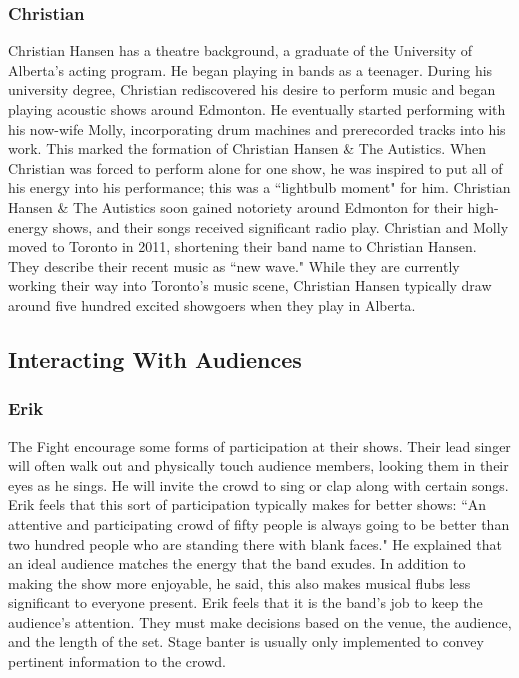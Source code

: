 \subsubsection{Christian}
Christian Hansen has a theatre background, a graduate of the University of Alberta's acting program. He began playing in bands as a teenager. During his university degree, Christian rediscovered his desire to perform music and began playing acoustic shows around Edmonton. He eventually started performing with his now-wife Molly, incorporating drum machines and prerecorded tracks into his work. This marked the formation of Christian Hansen \& The Autistics. When Christian was forced to perform alone for one show, he was inspired to put all of his energy into his performance; this was a ``lightbulb moment" for him. Christian Hansen \& The Autistics soon gained notoriety around Edmonton for their high-energy shows, and their songs received significant radio play. Christian and Molly moved to Toronto in 2011, shortening their band name to Christian Hansen. They describe their recent music as ``new wave." While they are currently working their way into Toronto's music scene, Christian Hansen typically draw around five hundred excited showgoers when they play in Alberta.

\subsection{Interacting With Audiences}

\subsubsection{Erik}
The Fight encourage some forms of participation at their shows. Their lead singer will often walk out and physically touch audience members, looking them in their eyes as he sings. He will invite the crowd to sing or clap along with certain songs. Erik feels that this sort of participation typically makes for better shows: ``An attentive and participating crowd of fifty people is always going to be better than two hundred people who are standing there with blank faces." He explained that an ideal audience matches the energy that the band exudes. In addition to making the show more enjoyable, he said, this also makes musical flubs less significant to everyone present. Erik feels that it is the band's job to keep the audience's attention. They must make decisions based on the venue, the audience, and the length of the set. Stage banter is usually only implemented to convey pertinent information to the crowd.

